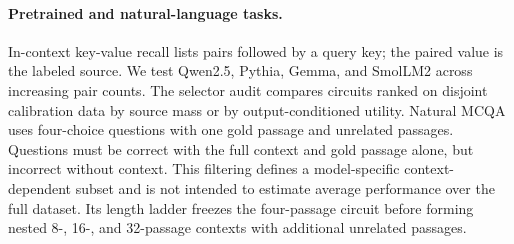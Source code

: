 \documentclass{article}
\begin{document}
\paragraph{Pretrained and natural-language tasks.}
In-context key-value recall lists pairs followed by a query key; the paired value is the labeled source.
We test Qwen2.5, Pythia, Gemma, and SmolLM2 across increasing pair counts. The selector audit compares circuits
ranked on disjoint calibration data by source mass or by output-conditioned utility. Natural MCQA uses
four-choice questions with one gold passage and unrelated passages. Questions must be correct with the full
context and gold passage alone, but incorrect without context. This filtering defines a model-specific
context-dependent subset and is not intended to estimate average performance over the full dataset. Its length
ladder freezes the four-passage circuit before forming nested 8-, 16-, and 32-passage contexts with additional
unrelated passages.
\end{document}
